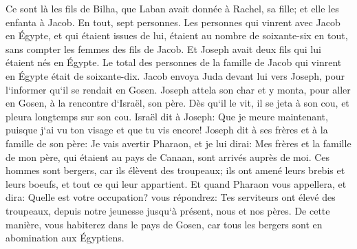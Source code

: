 \verse Ce sont là les fils de Bilha, que Laban avait donnée à Rachel, sa fille; et elle les enfanta à Jacob. En tout, sept personnes. 
\verse Les personnes qui vinrent avec Jacob en Égypte, et qui étaient issues de lui, étaient au nombre de soixante-six en tout, sans compter les femmes des fils de Jacob. 
\verse Et Joseph avait deux fils qui lui étaient nés en Égypte. Le total des personnes de la famille de Jacob qui vinrent en Égypte était de soixante-dix. 
\verse Jacob envoya Juda devant lui vers Joseph, pour l`informer qu`il se rendait en Gosen. 
\verse Joseph attela son char et y monta, pour aller en Gosen, à la rencontre d`Israël, son père. Dès qu`il le vit, il se jeta à son cou, et pleura longtemps sur son cou. 
\verse Israël dit à Joseph: Que je meure maintenant, puisque j`ai vu ton visage et que tu vis encore! 
\verse Joseph dit à ses frères et à la famille de son père: Je vais avertir Pharaon, et je lui dirai: Mes frères et la famille de mon père, qui étaient au pays de Canaan, sont arrivés auprès de moi. 
\verse Ces hommes sont bergers, car ils élèvent des troupeaux; ils ont amené leurs brebis et leurs boeufs, et tout ce qui leur appartient. 
\verse Et quand Pharaon vous appellera, et dira: 
\verse Quelle est votre occupation? vous répondrez: Tes serviteurs ont élevé des troupeaux, depuis notre jeunesse jusqu`à présent, nous et nos pères. De cette manière, vous habiterez dans le pays de Gosen, car tous les bergers sont en abomination aux Égyptiens. 

